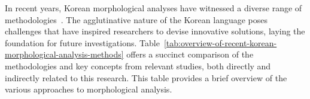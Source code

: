 \documentclass[AMS,STIX2COL]{WileyNJD-v2}
\begin{document}
    In recent years, Korean morphological analyses have witnessed a diverse range of methodologies~\cite{KwonHC1991, LeeDG2009, ShimKS2011, LeeJS2011, ShinJC2012, LeeCK2013, NaSH2014, NaSH2015, HwangHS2016, KimHM2016, ChungES2016, LeeCH2016, Li2017, NaSH2018, KimSW2018, ChoiYS2018, MinJW2018, MinJW2019, KimHM2019, SongHJ2019, MinJW2020, SongHJ2020, ChoiYS2020, HwangHS2020, KimHJ2021, YounJY2021, MinJW2022, KimJM2022, ShinHJ2023}.
    The agglutinative nature of the Korean language poses challenges that have inspired researchers to devise innovative solutions, laying the foundation for future investigations.
    Table~\ref{tab:overview-of-recent-korean-morphological-analysis-methods} offers a succinct comparison of the methodologies and key concepts from relevant studies, both directly and indirectly related to this research.
    This table provides a brief overview of the various approaches to morphological analysis.
\end{document}
